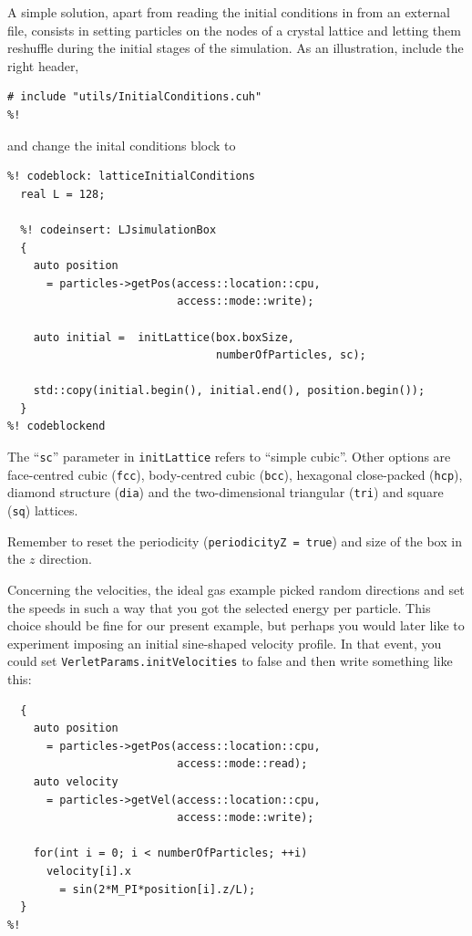 A simple solution, apart from reading the initial conditions in from an external 
file, consists in setting particles on the nodes of a crystal lattice and 
letting them reshuffle during the initial stages of the simulation. As an
illustration, include the right header,
\begin{lstlisting}
# include "utils/InitialConditions.cuh"
%!
\end{lstlisting}
and change the inital conditions block to
\begin{lstlisting}
%! codeblock: latticeInitialConditions
  real L = 128;

  %! codeinsert: LJsimulationBox
  {
    auto position
      = particles->getPos(access::location::cpu,
                          access::mode::write);

    auto initial =  initLattice(box.boxSize,
                                numberOfParticles, sc);

    std::copy(initial.begin(), initial.end(), position.begin());
  }
%! codeblockend
\end{lstlisting}
The ``\texttt{sc}'' parameter in \texttt{initLattice} refers to ``simple
cubic''. Other options are face-centred cubic (\texttt{fcc}), body-centred cubic
(\texttt{bcc}), hexagonal close-packed (\texttt{hcp}), diamond structure
(\texttt{dia}) and the two-dimensional triangular (\texttt{tri}) and square
(\texttt{sq}) lattices.

Remember to reset the periodicity (\texttt{periodicityZ = true}) and size of the
box in the $z$ direction.

Concerning the velocities, the ideal gas example picked random directions and set
the speeds in such a way that you got the selected energy per particle.
This choice should be fine for our present example, but perhaps you
would later like to experiment imposing an initial sine-shaped velocity profile.
In that event, you could set \texttt{VerletParams.initVelocities} to false and
then write something like this:
\begin{lstlisting}
  {
    auto position
      = particles->getPos(access::location::cpu,
                          access::mode::read);
    auto velocity
      = particles->getVel(access::location::cpu,
                          access::mode::write);

    for(int i = 0; i < numberOfParticles; ++i)
      velocity[i].x
        = sin(2*M_PI*position[i].z/L);
  }
%!
\end{lstlisting}

